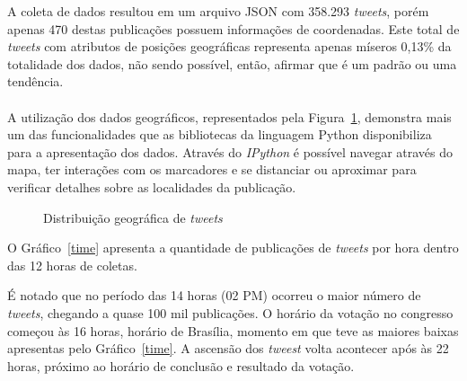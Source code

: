 A coleta de dados resultou em um arquivo JSON com 358.293 \textit{tweets}, porém apenas 470 destas publicações possuem informações de coordenadas. Este total de \textit{tweets} com atributos de posições geográficas representa apenas míseros 0,13\% da totalidade dos dados, não sendo possível, então, afirmar que é um padrão ou uma tendência. \\ \\

A utilização dos dados geográficos, representados pela Figura~\ref{fig:mapa}, demonstra mais um das funcionalidades que as bibliotecas da linguagem Python disponibiliza para a apresentação dos dados. Através do \textit{IPython} é possível navegar através do mapa, ter interações com os marcadores e se distanciar ou aproximar para verificar detalhes sobre as localidades da publicação.

\begin{figure}[h]
	\centering
	\vspace{-0.2cm}
	\caption{Distribuição geográfica de \textit{tweets}}
	\label{fig:mapa}
\end{figure}

O Gráfico~\ref{time} apresenta a quantidade de publicações de \textit{tweets} por hora dentro das 12 horas de coletas.

É notado que no período das 14 horas (02 PM) ocorreu o maior número de \textit{tweets}, chegando a quase 100 mil publicações. O horário da votação no congresso começou às 16 horas, horário de Brasília, momento em que teve as maiores baixas apresentas pelo Gráfico~\ref{time}. A ascensão dos \textit{tweest} volta acontecer após às 22 horas, próximo ao horário de conclusão e resultado da votação. \\ \\ \\ \\ \\ \\ \\ \\

